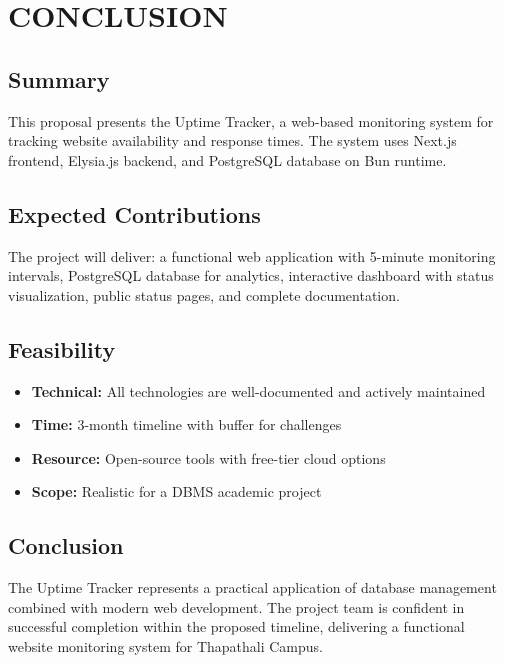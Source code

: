 \chapter{CONCLUSION}

\section{Summary}

This proposal presents the Uptime Tracker, a web-based monitoring system for tracking website availability and response times. The system uses Next.js frontend, Elysia.js backend, and PostgreSQL database on Bun runtime.

\section{Expected Contributions}

The project will deliver: a functional web application with 5-minute monitoring intervals, PostgreSQL database for analytics, interactive dashboard with status visualization, public status pages, and complete documentation.

\section{Feasibility}

\begin{itemize}
    \item \textbf{Technical:} All technologies are well-documented and actively maintained
    \item \textbf{Time:} 3-month timeline with buffer for challenges
    \item \textbf{Resource:} Open-source tools with free-tier cloud options
    \item \textbf{Scope:} Realistic for a DBMS academic project
\end{itemize}

\section{Conclusion}

The Uptime Tracker represents a practical application of database management combined with modern web development. The project team is confident in successful completion within the proposed timeline, delivering a functional website monitoring system for Thapathali Campus.
